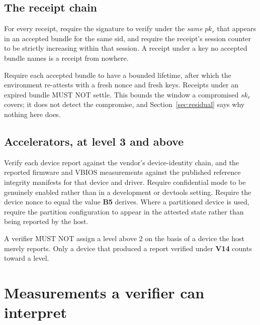 \documentclass[11pt,a4paper]{article}
\newcommand{\req}[1]{\textbf{#1}}
\begin{document}
\subsection{The receipt chain}

\begin{description}[leftmargin=1.6em]
\item[\req{V12}] For every receipt, require the signature to verify under the
\emph{same} $pk_r$ that appears in an accepted bundle for the same $\mathrm{sid}$,
and require the receipt's session counter to be strictly increasing within that
session. A receipt under a key no accepted bundle names is a receipt from nowhere.

\item[\req{V13}] Require each accepted bundle to have a bounded lifetime, after
which the environment re-attests with a fresh nonce and fresh keys. Receipts under
an expired bundle MUST NOT settle. This bounds the window a compromised $sk_r$
covers; it does not detect the compromise, and Section~\ref{sec:residual} says why
nothing here does.
\end{description}

\subsection{Accelerators, at level 3 and above}

\begin{description}[leftmargin=1.6em]
\item[\req{V14}] Verify each device report against the vendor's device-identity
chain, and the reported firmware and VBIOS measurements against the published
reference integrity manifests for that device and driver. Require confidential mode
to be genuinely enabled rather than in a development or devtools setting. Require
the device nonce to equal the value \req{B5} derives. Where a partitioned device is
used, require the partition configuration to appear in the attested state rather
than being reported by the host.

\item[\req{V15}] A verifier MUST NOT assign a level above 2 on the basis of a
device the host merely reports. Only a device that produced a report verified under
\req{V14} counts toward a level.
\end{description}

\section{Measurements a verifier can interpret}
\label{sec:log}
\end{document}
